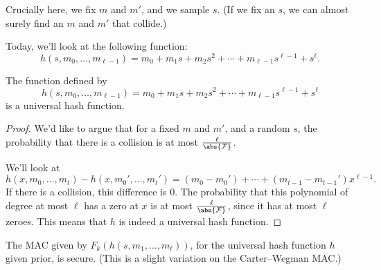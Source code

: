 \documentclass[12pt]{tufte-book}
\begin{document}
Crucially here, we fix $m$ and $m'$, and we sample $s$. (If we fix an $s$, we can almost surely find an $m$ and $m'$ that collide.)

Today, we'll look at the following function:
\[
    h(s, m_0, \ldots, m_{\ell - 1}) = m_0 + m_1 s + m_2 s^2 + \cdots + m_{\ell - 1} s^{\ell - 1} + s^{\ell}
.\]

\begin{claim}
    The function defined by
    \[
        h(s, m_0, \ldots, m_{\ell - 1}) = m_0 + m_1 s + m_2 s^2 + \cdots + m_{\ell - 1} s^{\ell - 1} + s^{\ell}
    \]
    is a universal hash function.
\end{claim}

\begin{proof}
    We'd like to argue that for a fixed $m$ and $m'$, and a random $s$, the probability that there is a collision is at most $\frac{\ell}{\abs{\mathcal{F}}}$.

    We'll look at
    \[
        h(x, m_0, \ldots, m_t) - h(x, m_0', \ldots, m_t') = (m_0 - m_0') + \cdots + (m_{t - 1} - m_{t-1}') x^{\ell - 1}
    .\]
    If there is a collision, this difference is 0. The probability that this polynomial of degree at most $\ell$ has a zero at $x$ is at most $\frac{\ell}{\abs{\mathcal{F}}}$, since it has at most $\ell$ zeroes. This means that $h$ is indeed a universal hash function.
\end{proof}

\begin{claim}
    The MAC given by $F_k(h(s, m_1, \ldots, m_{\ell}))$, for the universal hash function $h$ given prior, is secure. (This is a slight variation on the Carter--Wegman MAC.)
\end{claim}
\end{document}
